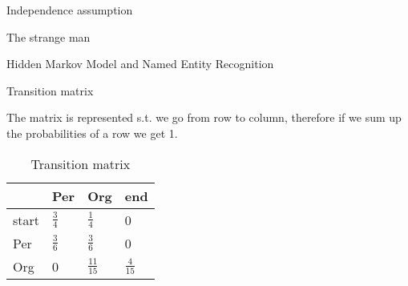 \documentclass[12pt]{article}
\newenvironment{question}[2][Question]{\begin{trivlist}
\item[\hskip \labelsep {\bfseries #1}\hskip \labelsep {\bfseries #2.}]}{\end{trivlist}}
\newenvironment{answer}[2][Answer]{\begin{trivlist}
\item[\hskip \labelsep {\bfseries #1}\hskip \labelsep {\bfseries #2:}]}{\end{trivlist}}
\begin{document}
\begin{question}{2}
Independence assumption
\end{question}

\begin{answer}{a)}
The strange man
\end{answer}

\begin{answer}{b)}
\end{answer}

\begin{answer}{c)}
\end{answer}

\begin{question}{3}
Hidden Markov Model and Named Entity Recognition
\end{question}

\begin{answer}{a)}{Transition matrix}

The matrix is represented s.t. we go from row to column, therefore if we sum up the probabilities of a row we get 1.
\begin{table}[h!]
\centering
\caption{Transition matrix}
\label{my-label}
\begin{tabular}{|l|l|l|l|}
\hline
      & Per           & Org             & end            \\ \hline
start & $\frac{3}{4}$ & $\frac{1}{4}$   & 0              \\ \hline
Per   & $\frac{3}{6}$ & $\frac{3}{6}$   & 0              \\ \hline
Org   & 0             & $\frac{11}{15}$ & $\frac{4}{15}$ \\ \hline
\end{tabular}
\end{table}
\end{answer}

\begin{answer}{b)}
\end{answer}

\begin{answer}{c)}
\end{answer}

\begin{answer}{d)}
\end{answer}
\end{document}
